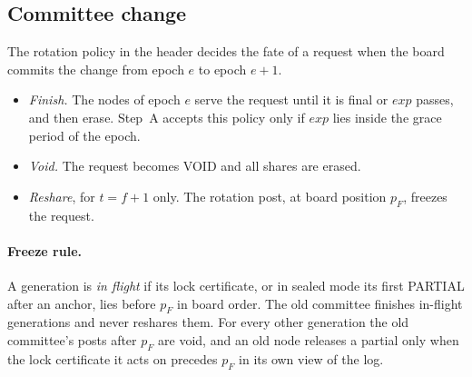 \subsection{Committee change}\label{sec:rotation}

The rotation policy in the header decides the fate of a request when the board commits the change from epoch $e$ to epoch $e+1$.

\begin{itemize}[leftmargin=1.5em]
\item \emph{Finish.} The nodes of epoch $e$ serve the request until it is final or $exp$ passes, and then erase. Step~A accepts this policy only if $exp$ lies inside the grace period of the epoch.
\item \emph{Void.} The request becomes \textsf{VOID} and all shares are erased.
\item \emph{Reshare}, for $t = f+1$ only. The rotation post, at board position $p_F$, freezes the request.
\end{itemize}

\paragraph{Freeze rule.} A generation is \emph{in flight} if its lock certificate, or in sealed mode its first PARTIAL after an anchor, lies before $p_F$ in board order. The old committee finishes in-flight generations and never reshares them. For every other generation the old committee's posts after $p_F$ are void, and an old node releases a partial only when the lock certificate it acts on precedes $p_F$ in its own view of the log.

